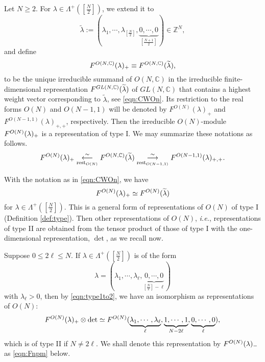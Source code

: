 Let $N \ge 2$. 
For $\lambda \in \Lambda^+([\frac N 2])$, 
 we extend it to 
\begin{equation}
\label{eqn:lmdtilde}
   \widetilde \lambda 
 :=(\lambda_1, \cdots, \lambda_{[\frac N 2]}, 
    \underbrace{0,\cdots,0}_{[\frac{N+1}{2}]}) \in {\mathbb{Z}}^N, 
\end{equation}
 and define 
\begin{equation}
\label{eqn:Fholohw}
F^{{O(N,{\mathbb{C}})}}({\lambda})_+
\equiv
F^{{O(N,{\mathbb{C}})}}({\widetilde \lambda}), 
\end{equation}
to be the unique irreducible summand
 of $O(N,{\mathbb{C}})$ in the irreducible finite-dimensional representation 
 $F^{{G L(N,{\mathbb{C}})}}({\widetilde \lambda})$
 of $GL(N,{\mathbb{C}})$
 that contains a highest weight vector
 corresponding to $\widetilde \lambda$, 
 see \eqref{eqn:CWOn}.  
Its restriction to the real forms $O(N)$ and $O(N-1,1)$
 will be denoted by $F^{O(N)}(\lambda)_+$ and $F^{O(N-1,1)}(\lambda)_{+,+}$, 
 respectively.  
Then the irreducible $O(N)$-module $F^{{O(N)}}({\lambda})_+$ 
 is a representation of type I.  
We may summarize these notations
 as follows.  
\begin{equation}
\label{eqn:ONCreal}
   F^{{O(N)}}({\lambda})_+
   \underset{{\operatorname{rest}}_{O(N)}}{\overset \sim \longleftarrow}
   F^{{O(N, {\mathbb{C}})}}({\widetilde{\lambda}})
   \underset{{\operatorname{rest}}_{O(N-1,1)}}{\overset \sim \longrightarrow}
   F^{{O(N-1,1)}}({\lambda})_{+,+}.  
\end{equation}
\begin{remark}
\label{rem:FOn}
With the notation as in \eqref{eqn:CWOn}, 
 we have
\[
   F^{{O(N)}}({\lambda})_+
   \simeq
   F^{{O(N)}}({\widetilde{\lambda}})
\]
for $\lambda \in \Lambda^+([\frac N 2])$.  
This is a general form 
 of representations of $O(N)$ of type I
 (Definition \ref{def:type}).  
Then other representations of $O(N)$, 
 {\it{i.e.}}, 
 representations of type II are obtained from the tensor product of those of type I
 with the one-dimensional representation, 
 $\det$, 
 as we recall now.  

Suppose $0 \le 2 \ell \le N$.  
If $\lambda \in \Lambda^+([\frac N 2])$ is of the form 
\[
   \lambda =(\lambda_1, \cdots, \lambda_{\ell}, 
             \underbrace{0, \cdots,0}_{[\frac N 2]-{\ell}})
\]
with $\lambda_{\ell} >0$, 
then by \eqref{eqn:type1to2}, 
 we have an isomorphism
 as representations of $O(N)$:
\[
   F^{{O(N)}}({\lambda})_+ \otimes \det
   \simeq
   F^{{O(N)}}({\underbrace{\lambda_1, \cdots,\lambda_{\ell}}_{\ell}, 
   \underbrace{1, \cdots,1}_{N-2{\ell}}, \underbrace{0, \cdots,0}_\ell}), 
\]
which is of type II
 if $N \ne 2\ell$.  
We shall denote this representation by $F^{{O(N)}}({\lambda})_-$
 as \eqref{eqn:Fnpm} below.  
\end{remark}

